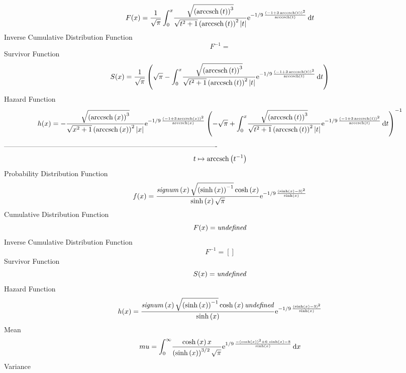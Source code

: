 \documentclass[12pt]{article}
\begin{document}
 $$F(x)={\frac {1}{\sqrt {\pi}}\int_{0}^{x}\!{\frac {\sqrt { \left( 
{\rm arccsch} \left(t\right) \right) ^{3}}}{\sqrt {{t}^{2}+1} \left( 
{\rm arccsch} \left(t\right) \right) ^{2} \left| t \right| }{{\rm e}^{
-1/9\,{\frac { \left( -1+3\,{\rm arccsch} \left(t\right) \right) ^{2}
}{{\rm arccsch} \left(t\right)}}}}}\,{\rm d}t}
$$ Inverse Cumulative Distribution Function 
  $$F^{-1} = $$Survivor Function 
 $$ S(x)={\frac {1}{\sqrt {\pi}} \left( \sqrt {\pi}-\int_{0}^{x}\!{\frac {
\sqrt { \left( {\rm arccsch} \left(t\right) \right) ^{3}}}{\sqrt {{t}^
{2}+1} \left( {\rm arccsch} \left(t\right) \right) ^{2} \left| t
 \right| }{{\rm e}^{-1/9\,{\frac { \left( -1+3\,{\rm arccsch} \left(t
\right) \right) ^{2}}{{\rm arccsch} \left(t\right)}}}}}\,{\rm d}t
 \right) }
$$ Hazard Function 
 $$ h(x)=-{\frac {\sqrt { \left( {\rm arccsch} \left(x\right) \right) ^{3}}}{
\sqrt {{x}^{2}+1} \left( {\rm arccsch} \left(x\right) \right) ^{2}
 \left| x \right| }{{\rm e}^{-1/9\,{\frac { \left( -1+3\,{\rm arccsch}
 \left(x\right) \right) ^{2}}{{\rm arccsch} \left(x\right)}}}} \left( 
-\sqrt {\pi}+\int_{0}^{x}\!{\frac {\sqrt { \left( {\rm arccsch} \left(
t\right) \right) ^{3}}}{\sqrt {{t}^{2}+1} \left( {\rm arccsch} \left(t
\right) \right) ^{2} \left| t \right| }{{\rm e}^{-1/9\,{\frac {
 \left( -1+3\,{\rm arccsch} \left(t\right) \right) ^{2}}{{\rm arccsch}
 \left(t\right)}}}}}\,{\rm d}t \right) ^{-1}}
$$-------------------------------------------------------------------------------------------  \\$$t\mapsto {\rm arccsch} \left({t}^{-1}\right)
$$Probability Distribution Function 
$$  f(x)={\frac {{\it signum} \left( x \right) \sqrt { \left( \sinh \left( x
 \right)  \right) ^{-1}}\cosh \left( x \right) }{\sinh \left( x
 \right) \sqrt {\pi}}{{\rm e}^{-1/9\,{\frac { \left( \sinh \left( x
 \right) -3 \right) ^{2}}{\sinh \left( x \right) }}}}}
$$Cumulative Distribution Function  
 $$F(x)={\it undefined}
$$ Inverse Cumulative Distribution Function 
  $$F^{-1} = []
$$Survivor Function 
 $$ S(x)={\it undefined}
$$ Hazard Function 
 $$ h(x)={\frac {{\it signum} \left( x \right) \sqrt { \left( \sinh \left( x
 \right)  \right) ^{-1}}\cosh \left( x \right) {\it undefined}}{\sinh
 \left( x \right) }{{\rm e}^{-1/9\,{\frac { \left( \sinh \left( x
 \right) -3 \right) ^{2}}{\sinh \left( x \right) }}}}}
$$Mean 
 $$ mu=\int_{0}^{\infty }\!{\frac {\cosh \left( x \right) x}{ \left( \sinh
 \left( x \right)  \right) ^{3/2}\sqrt {\pi}}{{\rm e}^{1/9\,{\frac {-
 \left( \cosh \left( x \right)  \right) ^{2}+6\,\sinh \left( x
 \right) -8}{\sinh \left( x \right) }}}}}\,{\rm d}x
$$ Variance 
\end{document}
